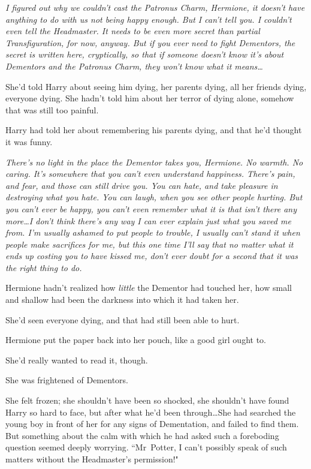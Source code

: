 \emph{I figured out why we couldn't cast the Patronus Charm, Hermione, it doesn't have anything to do with us not being happy enough. But I can't tell you. I couldn't even tell the Headmaster. It needs to be even more secret than partial Transfiguration, for now, anyway. But if you ever need to fight Dementors, the secret is written here, cryptically, so that if someone doesn't know it's about Dementors and the Patronus Charm, they won't know what it means…}

She'd told Harry about seeing him dying, her parents dying, all her friends dying, everyone dying. She hadn't told him about her terror of dying alone, somehow that was still too painful.

Harry had told her about remembering his parents dying, and that he'd thought it was funny.

\emph{There's no light in the place the Dementor takes you, Hermione. No warmth. No caring. It's somewhere that you can't even understand happiness. There's pain, and fear, and those can still drive you. You can hate, and take pleasure in destroying what you hate. You can laugh, when you see other people hurting. But you can't ever be happy, you can't even remember what it is that isn't there any more…I don't think there's any way I can ever explain just what you saved me from. I'm usually ashamed to put people to trouble, I usually can't stand it when people make sacrifices for me, but this one time I'll say that no matter what it ends up costing you to have kissed me, don't ever doubt for a second that it was the right thing to do.}

Hermione hadn't realized how \emph{little} the Dementor had touched her, how small and shallow had been the darkness into which it had taken her.

She'd seen everyone dying, and that had still been able to hurt.

Hermione put the paper back into her pouch, like a good girl ought to.

She'd really wanted to read it, though.

She was frightened of Dementors.


She felt frozen; she shouldn't have been so shocked, she shouldn't have found Harry so hard to face, but after what he'd been through…She had searched the young boy in front of her for any signs of Dementation, and failed to find them. But something about the calm with which he had asked such a foreboding question seemed deeply worrying. ``Mr~Potter, I can't possibly speak of such matters without the Headmaster's permission!"


